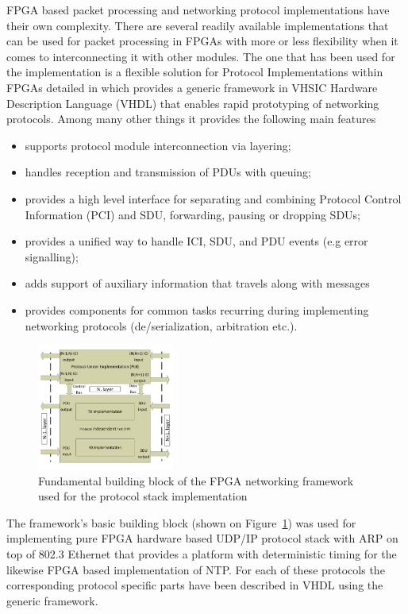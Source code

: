 \documentclass[article]{IEEEtran}
\begin{document}
FPGA based packet processing and networking protocol implementations have their own complexity. There are several readily available implementations that can be used for packet processing in FPGAs with more or less flexibility when it comes to interconnecting it
with other modules. The one that has been used for the implementation is a flexible solution for  Protocol Implementations within FPGAs detailed in \cite{ProtoImpl} which provides a generic framework in VHSIC Hardware Description Language (VHDL) that enables rapid prototyping of networking protocols. Among many other things it provides the following main features
\begin{itemize}
    \renewcommand \labelitemi{--}
    \item supports protocol module interconnection via layering;
    \item handles reception and transmission of PDUs with queuing;
    \item provides a high level interface for separating and combining  Protocol Control Information (PCI) and SDU,
          forwarding, pausing or dropping SDUs;
    \item provides a unified way to handle ICI, SDU, and PDU events (e.g error signalling);
    \item adds support of auxiliary information that travels along with messages
    \item provides components for common tasks recurring during implementing networking protocols
          (de/serialization, arbitration etc.).
\end{itemize}

\begin{figure}[!htb]
    \centering
    \includegraphics[width=0.4\textwidth]{figures_raw/system_sketch.pdf}
    \caption{Fundamental building block of the FPGA networking framework used for the protocol stack implementation}
    \label{fig:system_sketch}
\end{figure}

The framework's basic building block (shown on Figure~\ref{fig:system_sketch}) was used for implementing pure FPGA hardware based
UDP/IP protocol stack with ARP on top of 802.3 Ethernet that provides a platform with deterministic timing for the likewise FPGA based
implementation of NTP. For each of these protocols the corresponding protocol specific parts have been described in VHDL using the generic framework. 
\end{document}
